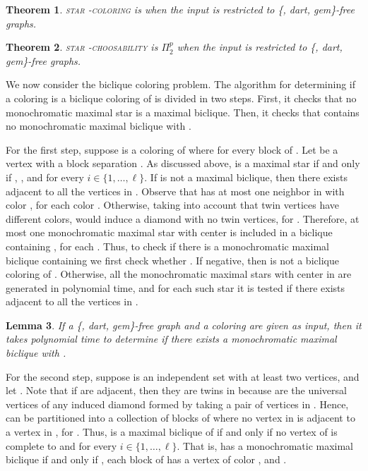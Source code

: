 \documentclass[a4paper, 11pt, oneside]{article}
\newtheorem{theorem}{Theorem}
\newtheorem{lemma}[theorem]{Lemma}
\newcommand{\stcol}[1]{\textsc{star -coloring}}
\newcommand{\stchose}[1]{\textsc{star -choosability}}
\newcommand{\ptwop}{\ensuremath{\Pi^p_2}\xspace}
\newcommand{\range}[3]{\ensuremath{#1 \in \{#2,\ldots,#3\}}}
\begin{document}
\begin{theorem}\label{thm:np w4-dart-gem}
 \stcol{k} is \NP when the input is restricted to \{, dart, gem\}-free graphs.
\end{theorem}

\begin{theorem}\label{thm:ptp w4-dart-gem}
 \stchose{k} is \ptwop when the input is restricted to \{, dart, gem\}-free graphs.
\end{theorem}

We now consider the biclique coloring problem.  The algorithm for determining if a coloring  is a biclique coloring of  is divided in two steps.  First, it checks that no monochromatic maximal star is a maximal biclique.  Then, it checks that  contains no monochromatic maximal biclique  with . 

For the first step, suppose  is a coloring of  where  for every block  of .  Let  be a vertex with a block separation .  As discussed above,  is a maximal star if and only if , , and  for every \range{i}{1}{\ell}.  If  is not a maximal biclique, then there exists   adjacent to all the vertices in .  Observe that  has at most one neighbor in  with color , for each color .  Otherwise, taking into account that twin vertices have different colors,  would induce a diamond with no twin vertices, for .  Therefore, at most one monochromatic maximal star with center  is included in a biclique containing , for each .  Thus, to check if there is a monochromatic maximal biclique containing  we first check whether .  If negative, then  is not a biclique coloring of .  Otherwise, all the monochromatic maximal stars with center in  are generated in polynomial time, and for each such star  it is tested if there exists  adjacent to all the vertices in .

\begin{lemma}\label{lem:w4-dart-gem stars}
 If a \{, dart, gem\}-free graph  and a coloring  are given as input, then it takes polynomial time to determine if there exists a monochromatic maximal biclique  with .
\end{lemma}

For the second step, suppose  is an independent set with at least two vertices, and let .  Note that if  are adjacent, then they are twins in  because  are the universal vertices of any induced diamond formed by taking a pair of vertices in .  Hence,  can be partitioned into a collection  of blocks of  where no vertex in  is adjacent to a vertex in , for .  Thus,  is a maximal biclique of  if and only if no vertex of  is complete to  and  for every \range{i}{1}{\ell}.  That is,  has a monochromatic maximal biclique  if and only if , each block of  has a vertex of color , and .
\end{document}
